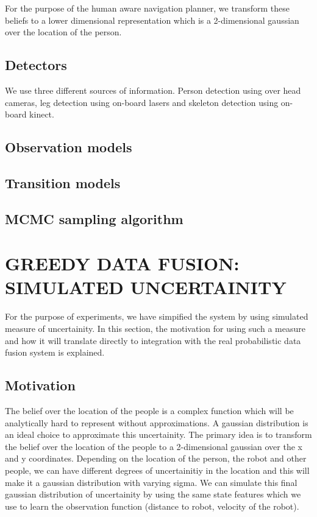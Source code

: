 For the purpose of the human aware navigation planner, we transform these beliefs to a lower dimensional representation which is a 2-dimensional gaussian over the location of the person.

\subsection{Detectors}
We use three different sources of information. Person detection using over head cameras, leg detection using on-board lasers and skeleton detection using on-board kinect. 

\subsection{Observation models}

\subsection{Transition models}

\subsection{MCMC sampling algorithm}


\section{GREEDY DATA FUSION: SIMULATED UNCERTAINITY}
For the purpose of experiments, we have simpified the system by using simulated measure of uncertainity. In this section, the motivation for using such a measure and how it will translate directly to integration with the real probabilistic data fusion system is explained.

\subsection{Motivation} 
The belief over the location of the people is a complex function which will be analytically hard to represent without approximations. A gaussian distribution is an ideal choice to approximate this uncertainity. The primary idea is to transform the belief over the location of the people to a 2-dimensional gaussian over the x and y coordinates. Depending on the location of the person, the robot and other people, we can have different degrees of uncertainitiy in the location and this will make it a gaussian distribution with varying sigma. We can simulate this final gaussian distribution of uncertainity by using the same state features which we use to learn the observation function (distance to robot, velocity of the robot). 

